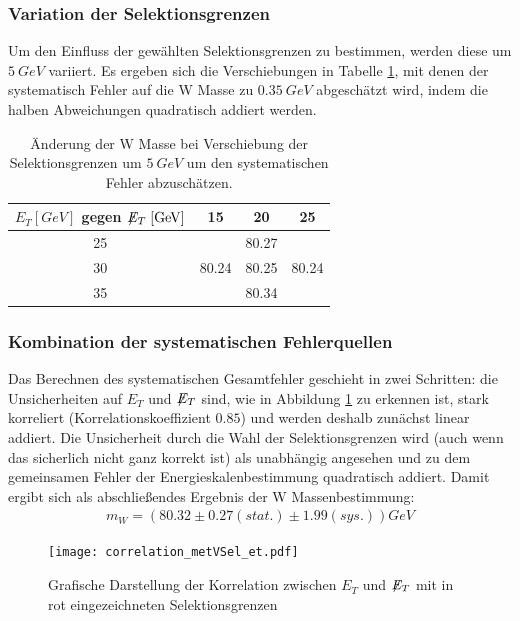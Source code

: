\documentclass[a4paper,12pt]{article}
\newcommand{\met}{\ensuremath{\not\mathrel{E}}_T}
\begin{document}
\subsubsection*{Variation der Selektionsgrenzen}
Um den Einfluss der gewählten Selektionsgrenzen zu bestimmen, werden diese um $\SI{5}{GeV}$
variiert. Es ergeben sich die Verschiebungen in Tabelle \ref{tab:variation}, mit denen der systematisch Fehler
auf die W Masse zu $\SI{0.35}{GeV}$ abgeschätzt wird, indem die halben Abweichungen quadratisch addiert werden.
\begin{table}[h]
	\centering
	\begin{tabular}{c| c c c}
		$E_{T} [\si{GeV}]$ gegen $\met [\si{GeV}]$ & 15 & 20 & 25 \\
		\hline
		25 &  & 80.27 & \\
		30 & 80.24 & 80.25 & 80.24 \\
		35 &  & 80.34 &
	\end{tabular}
	\caption{Änderung der W Masse bei Verschiebung der Selektionsgrenzen um $\SI{5}{GeV}$ um den
systematischen Fehler abzuschätzen.}
	\label{tab:variation}
\end{table}

\subsubsection*{Kombination der systematischen Fehlerquellen}
Das Berechnen des systematischen Gesamtfehler geschieht in zwei Schritten:
die Unsicherheiten auf $E_{T}$ und $\met$ sind, wie in Abbildung \ref{fig:etVSmet} zu erkennen ist, stark korreliert (Korrelationskoeffizient $0.85$)
und werden deshalb zunächst linear addiert. Die Unsicherheit durch die Wahl der Selektionsgrenzen wird (auch wenn das sicherlich nicht ganz korrekt ist)
als unabhängig angesehen und zu dem gemeinsamen Fehler der Energieskalenbestimmung quadratisch addiert. Damit ergibt sich als abschließendes Ergebnis der
W Massenbestimmung:
\begin{align*}
	m_W = ( 80.32 ± 0.27 (stat.) ± 1.99(sys.)) \si{GeV}
\end{align*}
\begin{figure}[htb]
	\centering
	\texttt{[image: correlation\_metVSel\_et.pdf]}
	\caption{Grafische Darstellung der Korrelation zwischen $E_{T}$ und $\met$ mit in rot eingezeichneten Selektionsgrenzen}
	\label{fig:etVSmet}
\end{figure}
\end{document}
